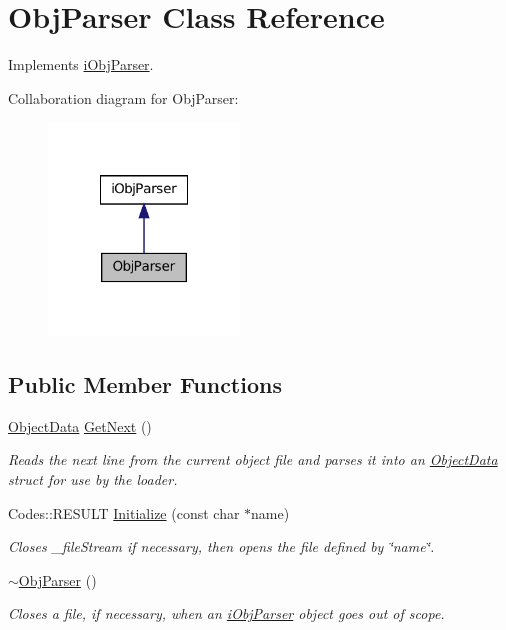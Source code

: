 \hypertarget{classObjParser}{
\section{ObjParser Class Reference}
\label{classObjParser}
}


Implements \hyperlink{classiObjParser}{iObjParser}.  




Collaboration diagram for ObjParser:\nopagebreak
\begin{figure}[H]
\begin{center}
\leavevmode
\includegraphics[width=144pt]{classObjParser__coll__graph}
\end{center}
\end{figure}
\subsection*{Public Member Functions}
\begin{DoxyCompactItemize}
\item 
\hyperlink{structObjectData}{ObjectData} \hyperlink{classObjParser_a653f83071fd63e3fdf04f28699f2fff5}{GetNext} ()
\begin{DoxyCompactList}\small\item\em Reads the next line from the current object file and parses it into an \hyperlink{structObjectData}{ObjectData} struct for use by the loader. \item\end{DoxyCompactList}\item 
Codes::RESULT \hyperlink{classObjParser_ae8d9939f390a68901e256d8a3187c24a}{Initialize} (const char $\ast$name)
\begin{DoxyCompactList}\small\item\em Closes \_\-fileStream if necessary, then opens the file defined by \char`\"{}name\char`\"{}. \item\end{DoxyCompactList}\item 
\hypertarget{classObjParser_aea8cf97813333011fcfa8ed67327009d}{
\hyperlink{classObjParser_aea8cf97813333011fcfa8ed67327009d}{$\sim$ObjParser} ()}
\label{classObjParser_aea8cf97813333011fcfa8ed67327009d}

\begin{DoxyCompactList}\small\item\em Closes a file, if necessary, when an \hyperlink{classiObjParser}{iObjParser} object goes out of scope. \item\end{DoxyCompactList}\end{DoxyCompactItemize}
